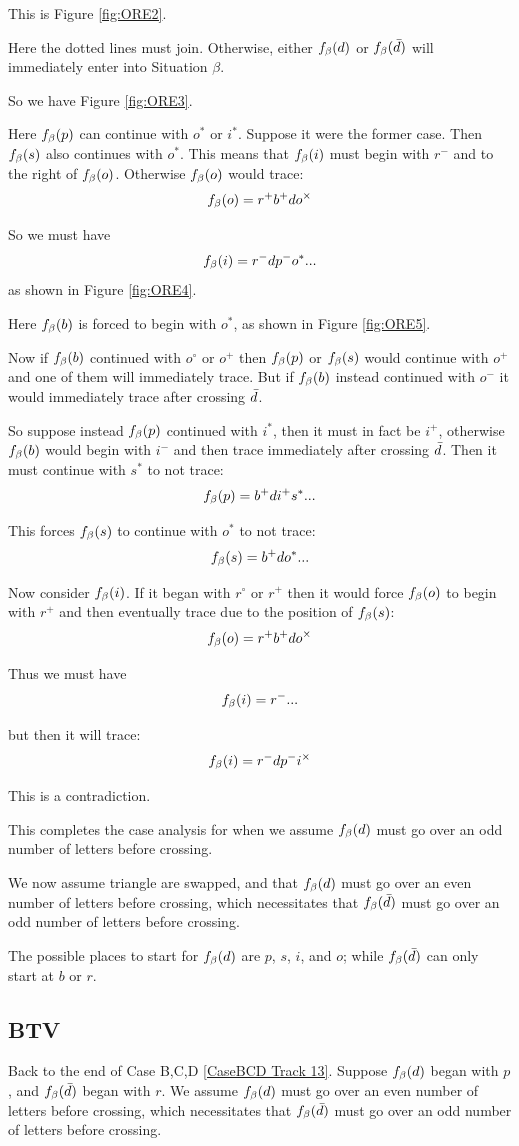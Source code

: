 This is Figure \ref{fig:ORE2}.

Here the dotted lines must join. Otherwise, either $f_\beta(d)$ or $f_\beta(\bar{d})$ will immediately enter into Situation $\beta$.

So we have Figure \ref{fig:ORE3}.

Here $f_\beta(p)$ can continue with $o^*$ or $i^*$. Suppose it were the former case. Then $f_\beta(s)$ also continues with $o^*$. This means that $f_\beta(i)$ must begin with $r^-$ and to the right of $f_\beta(o)$. Otherwise $f_\beta(o)$ would trace:
\[
f_\beta(o) = r^+ b^+ d o^\times
\]

So we must have
\[
f_\beta(i) = r^- d p^- o^*...
\]
as shown in Figure \ref{fig:ORE4}.

Here $f_\beta(b)$ is forced to begin with $o^*$, as shown in Figure \ref{fig:ORE5}.

Now if $f_\beta(b)$ continued with $o^\circ$ or $o^+$ then $f_\beta(p)$ or $f_\beta(s)$ would continue with $o^+$ and one of them will immediately trace. But if $f_\beta(b)$ instead continued with $o^-$ it would immediately trace after crossing $\bar{d}$.

So suppose instead $f_\beta(p)$ continued with $i^*$, then it must in fact be $i^+$, otherwise $f_\beta(b)$ would begin with $i^-$ and then trace immediately after crossing $\bar{d}$. Then it must continue with $s^*$ to not trace:
\[
f_\beta(p) = b^+ d i^+ s^*...
\]

This forces $f_\beta(s)$ to continue with $o^*$ to not trace:
\[
f_\beta(s) = b^+ d o^*...
\]

Now consider $f_\beta(i)$. If it began with $r^\circ$ or $r^+$ then it would force $f_\beta(o)$ to begin with $r^+$ and then eventually trace due to the position of $f_\beta(s)$:
\[
f_\beta(o) = r^+ b^+ d o^\times
\]

Thus we must have
\[
f_\beta(i) = r^-...
\]

but then it will trace:
\[
f_\beta(i) = r^- d p^- i^\times
\]

This is a contradiction.

This completes the case analysis for when we assume $f_\beta(d)$ must go over an odd number of letters before crossing.

We now assume triangle are swapped, and that $f_\beta(d)$ must go over an even number of letters before crossing, which necessitates that $f_\beta(\bar{d})$ must go over an odd number of letters before crossing.

The possible places to start for $f_\beta(d)$ are $p$, $s$, $i$, and $o$; while $f_\beta(\bar{d})$ can only start at $b$ or $r$.


\subsection{BTV}\label{BTV}
Back to the end of Case B,C,D \ref{CaseBCD Track 13}.
Suppose $f_\beta(d)$ began with $p$, and $f_\beta(\bar{d})$ began with $r$. We assume $f_\beta(d)$ must go over an even number of letters before crossing, which necessitates that $f_\beta(\bar{d})$ must go over an odd number of letters before crossing.

